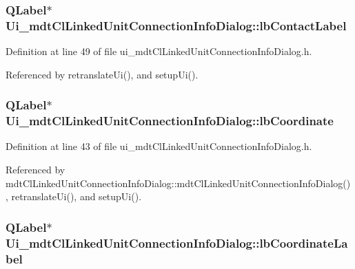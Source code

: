 \hypertarget{class_ui__mdt_cl_linked_unit_connection_info_dialog_a90645a3d063ec19330e5ec8a9165c03e}{
\subsubsection[{lb\-Contact\-Label}]{\setlength{\rightskip}{0pt plus 5cm}Q\-Label$\ast$ Ui\-\_\-mdt\-Cl\-Linked\-Unit\-Connection\-Info\-Dialog\-::lb\-Contact\-Label}}\label{class_ui__mdt_cl_linked_unit_connection_info_dialog_a90645a3d063ec19330e5ec8a9165c03e}


Definition at line 49 of file ui\-\_\-mdt\-Cl\-Linked\-Unit\-Connection\-Info\-Dialog.\-h.



Referenced by retranslate\-Ui(), and setup\-Ui().

\hypertarget{class_ui__mdt_cl_linked_unit_connection_info_dialog_a9ed34330d2ea90c5142c3ccbb93e323b}{
\subsubsection[{lb\-Coordinate}]{\setlength{\rightskip}{0pt plus 5cm}Q\-Label$\ast$ Ui\-\_\-mdt\-Cl\-Linked\-Unit\-Connection\-Info\-Dialog\-::lb\-Coordinate}}\label{class_ui__mdt_cl_linked_unit_connection_info_dialog_a9ed34330d2ea90c5142c3ccbb93e323b}


Definition at line 43 of file ui\-\_\-mdt\-Cl\-Linked\-Unit\-Connection\-Info\-Dialog.\-h.



Referenced by mdt\-Cl\-Linked\-Unit\-Connection\-Info\-Dialog\-::mdt\-Cl\-Linked\-Unit\-Connection\-Info\-Dialog(), retranslate\-Ui(), and setup\-Ui().

\hypertarget{class_ui__mdt_cl_linked_unit_connection_info_dialog_a6860855d2757d7134e4c5d7b6443fe4d}{
\subsubsection[{lb\-Coordinate\-Label}]{\setlength{\rightskip}{0pt plus 5cm}Q\-Label$\ast$ Ui\-\_\-mdt\-Cl\-Linked\-Unit\-Connection\-Info\-Dialog\-::lb\-Coordinate\-Label}}\label{class_ui__mdt_cl_linked_unit_connection_info_dialog_a6860855d2757d7134e4c5d7b6443fe4d}


